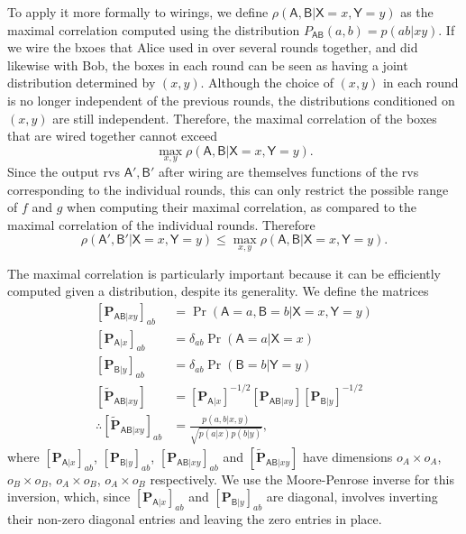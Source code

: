 \documentclass[10pt, a4paper]{article}
\numberwithin{equation}{section} %
\theoremstyle{definition}
\theoremstyle{plain}
\newcommand{\?}{\mathrel{?}} %
\newcommand{\matrp}[2]{\left[\mathbf{#1}#2\right]} %
\newcommand{\crv}[1]{\mathsf{#1}}
\begin{document}
    To apply it more formally to wirings, we define \(\rho(\crv{A},\crv{B}|\crv{X}=x,\crv{Y}=y)\) as the maximal correlation computed using the distribution \(P_{\crv{AB}}(a,b) = p(ab|xy)\). If we wire the bxoes that Alice used in over several rounds together, and did likewise with Bob, the boxes in each round can be seen as having a joint distribution determined by \((x,y)\). Although the choice of \((x,y)\) in each round is no longer independent of the previous rounds, the distributions conditioned on \((x,y)\) are still independent. Therefore, the maximal correlation of the boxes that are wired together cannot exceed
    \[ \max_{x,y} \rho(\crv{A},\crv{B}|\crv{X}=x,\crv{Y}=y). \]
    Since the output rvs \(\crv{A}', \crv{B}'\) after wiring are themselves functions of the rvs corresponding to the individual rounds, this can only restrict the possible range of \(f\) and \(g\) when computing their maximal correlation, as compared to the maximal correlation of the individual rounds. Therefore
    \[ \rho(\crv{A}',\crv{B}'|\crv{X}=x,\crv{Y}=y) \leq \max_{x,y} \rho(\crv{A},\crv{B}|\crv{X}=x,\crv{Y}=y). \]

    The maximal correlation is particularly important because it can be efficiently computed given a distribution, despite its generality. We define the matrices
    \begin{align}
      \matrp{P}{_{\crv{AB}|xy}}_{ab} &= \Pr(\crv{A} = a, \crv{B} = b|\crv{X} = x, \crv{Y} = y) \\
      \matrp{P}{_{\crv{A}|x}}_{ab} &= \delta_{ab} \Pr(\crv{A} = a|\crv{X} = x) \\
      \matrp{P}{_{\crv{B}|y}}_{ab} &= \delta_{ab} \Pr(\crv{B} = b|\crv{Y} = y) \\
      \matrp{\tilde{P}}{_{\crv{AB}|xy}} &= \matrp{P}{_{\crv{A}|x}}^{-1/2} \matrp{P}{_{\crv{AB}|xy}} \matrp{P}{_{\crv{B}|y}}^{-1/2} \\
      \therefore \matrp{\tilde{P}}{_{\crv{AB}|xy}}_{ab} &= \frac{p(a,b|x,y)}{\sqrt{p(a|x)p(b|y)}},
    \end{align}
    where \(\matrp{P}{_{\crv{A}|x}}_{ab}\), \(\matrp{P}{_{\crv{B}|y}}_{ab}\), \(\matrp{P}{_{\crv{AB}|xy}}_{ab}\) and \(\matrp{\tilde{P}}{_{\crv{AB}|xy}}\) have dimensions \(o_A \times o_A\), \(o_B \times o_B\), \(o_A \times o_B\), \(o_A \times o_B\) respectively. We use the Moore-Penrose inverse for this inversion, which, since \(\matrp{P}{_{\crv{A}|x}}_{ab}\) and \(\matrp{P}{_{\crv{B}|y}}_{ab}\) are diagonal, involves inverting their non-zero diagonal entries and leaving the zero entries in place.
\end{document}
